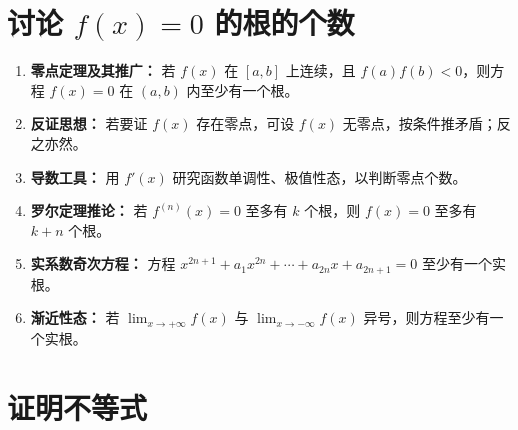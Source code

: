 \section{讨论 $f(x)=0$ 的根的个数}

\begin{enumerate}
    \item \textbf{零点定理及其推广：}
          若 $f(x)$ 在 $[a,b]$ 上连续，且 $f(a)f(b)<0$，则方程 $f(x)=0$ 在 $(a,b)$ 内至少有一个根。
    \item \textbf{反证思想：}
          若要证 $f(x)$ 存在零点，可设 $f(x)$ 无零点，按条件推矛盾；反之亦然。
    \item \textbf{导数工具：}
          用 $f'(x)$ 研究函数单调性、极值性态，以判断零点个数。
    \item \textbf{罗尔定理推论：}
          若 $f^{(n)}(x)=0$ 至多有 $k$ 个根，则 $f(x)=0$ 至多有 $k+n$ 个根。
    \item \textbf{实系数奇次方程：}
          方程 $x^{2n+1}+a_1x^{2n}+\cdots+a_{2n}x+a_{2n+1}=0$ 至少有一个实根。
    \item \textbf{渐近性态：}
          若 $\lim_{x\to+\infty}f(x)$ 与 $\lim_{x\to-\infty}f(x)$ 异号，则方程至少有一个实根。
\end{enumerate}

\section{证明不等式}

